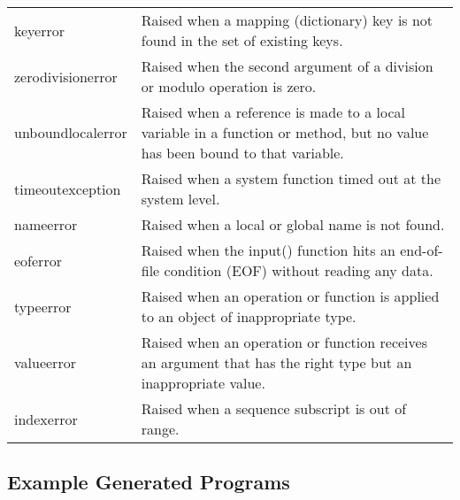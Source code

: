 \documentclass{article}
\begin{document}
\begin{table}[t]
\begin{tabular}{p{}p{}}
keyerror          & Raised when a mapping (dictionary) key is not found in the set of existing keys.                                                                           \\
zerodivisionerror & Raised when the second argument of a division or modulo operation is zero.                                                                                 \\
unboundlocalerror & Raised when a reference is made to a local variable in a function or method, but no value has been bound to that variable.                                 \\
timeoutexception  & Raised when a system function timed out at the system level.                                                                                               \\
nameerror         & Raised when a local or global name is not found.                                                                                                           \\
eoferror          & Raised when the input() function hits an end-of-file condition (EOF) without reading any data.                                                             \\
typeerror         & Raised when an operation or function is applied to an object of inappropriate type.                                                                        \\
valueerror        & Raised when an operation or function receives an argument that has the right type but an inappropriate value.                                              \\
indexerror        & Raised when a sequence subscript is out of range.                                                                           \\
\hline
\end{tabular}
\end{table} 

\subsection{Example Generated Programs} 
\label{app_sec:example_programs}
\end{document}
